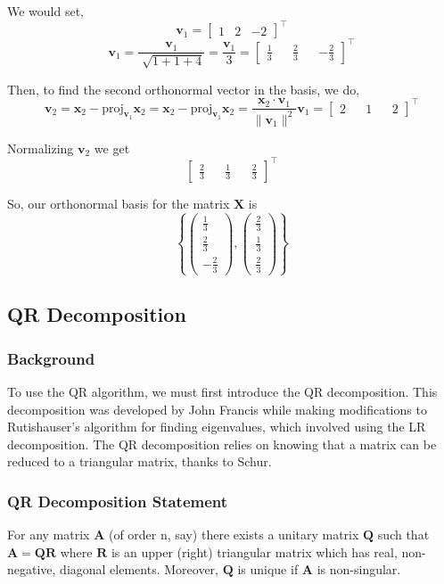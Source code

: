 \documentclass[onecolumn]{webofc}
\begin{document}
We would set, $$\mathbf{v}_1 = \begin{bmatrix} 1 & 2 & -2 \end{bmatrix}^{\top}$$
$$\mathbf{v}_1  = \frac{\mathbf{v}_1 }{\sqrt[]{1+1+4}} = \frac{\mathbf{v}_1 }{3} = \begin{bmatrix}
\frac{1}{3} && \frac{2}{3} && -\frac{2}{3}
\end{bmatrix}^{\top}$$

Then, to find the second orthonormal vector in the basis, we do,
$$\mathbf{v}_2 = \mathbf{x}_2 - \text{proj}_{\mathbf{v}_1}\mathbf{x}_2 = \mathbf{x}_2 - \text{proj}_{\mathbf{v}_1}\mathbf{x}_2 = \frac{\mathbf{x}_2 \cdot \mathbf{v}_1}{\|\mathbf{v}_1\|^{2}}\mathbf{v}_1 = \begin{bmatrix}
2 && 1 && 2
\end{bmatrix}^{\top}$$

Normalizing $\mathbf{v}_2$ we get $$\begin{bmatrix}
\frac{2}{3} && \frac{1}{3} && \frac{2}{3}
\end{bmatrix}^{\top}$$

So, our orthonormal basis for the matrix $\mathbf{X}$ is $$\left\{
\begin{pmatrix} \frac{1}{3} \\ \frac{2}{3} \\ -\frac{2}{3} \end{pmatrix},
\begin{pmatrix} \frac{2}{3} \\ \frac{1}{3} \\ \frac{2}{3}\end{pmatrix}
\right\}$$

\subsection{QR Decomposition}
\subsubsection*{Background}
To use the QR algorithm, we must first introduce the QR decomposition. This decomposition was developed by John Francis while making modifications to Rutishauser's algorithm for finding eigenvalues, which involved using the LR decomposition. The QR decomposition relies on knowing that a matrix can be reduced to a triangular matrix, thanks to Schur\cite{RefA}.

\subsubsection*{QR Decomposition Statement}
For any matrix $\mathbf{A}$ (of order n, say) there exists a unitary matrix $\mathbf{Q}$ such that $\mathbf{A} = \mathbf{QR}$ where $\mathbf{R}$ is an upper (right) triangular matrix which has real, non-negative, diagonal elements. Moreover, $\mathbf{Q}$ is unique if $\mathbf{A}$ is non-singular.
\end{document}
